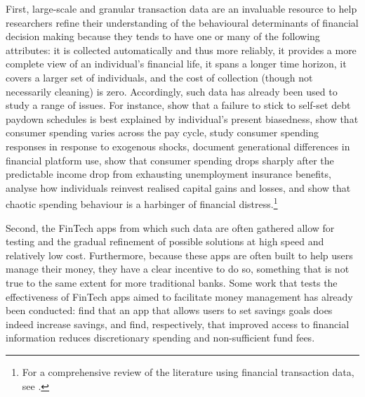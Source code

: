 First, large-scale and granular transaction data are an invaluable resource to
help researchers refine their understanding of the behavioural determinants of
financial decision making because they tends to have one or many of the following
attributes: it is collected automatically and thus more reliably, it provides a
more complete view of an individual's financial life, it spans a longer time
horizon, it covers a larger set of individuals, and the cost of collection
(though not necessarily cleaning) is zero. Accordingly, such data has already
been used to study a range of issues. For instance, \citet{kuchler2020sticking}
show that a failure to stick to self-set debt paydown schedules is best
explained by individual's present biasedness,
\citet{gelman2014harnessing,olafsson2018liquid} show that consumer spending
varies across the pay cycle, \citet{baker2018debt,baugh2014disentangling} study
consumer spending responses in response to exogenous shocks,
\citet{carlin2019generational} document generational differences in financial
platform use, \citet{ganong2019consumer} show that consumer spending drops
sharply after the predictable income drop from exhausting unemployment
insurance benefits, \citet{meyer2018fully} analyse how individuals reinvest
realised capital gains and losses, and \citet{muggleton2020evidence} show that
chaotic spending behaviour is a harbinger of financial distress.\footnote{For a
    comprehensive review of the literature using financial transaction data,
see \citet{baker2022household}.}

Second, the FinTech apps from which such data are often gathered allow for
testing and the gradual refinement of possible solutions at high speed and
relatively low cost. Furthermore, because these apps are often built to help
users manage their money, they have a clear incentive to do so, something that
is not true to the same extent for more traditional banks. Some work that tests
the effectiveness of FinTech apps aimed to facilitate money management has
already been conducted: \citet{gargano2021goal} find that an app that allows
users to set savings goals does indeed increase savings, and
\citet{levi2020mind, carlin2022mobile} find, respectively, that improved access
to financial information reduces discretionary spending and non-sufficient fund
fees.

